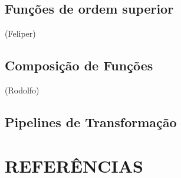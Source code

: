 \documentclass[date,twocolumn,a4paper]{ppgem}
\begin{document}
    \subsection{Funções de ordem superior}
    (Feliper)
    \subsection{Composição de Funções}
    (Rodolfo)
    \subsection{Pipelines de Transformação}


    \cite{amarante2001}
    \section{REFERÊNCIAS}
    
    
\end{document}
